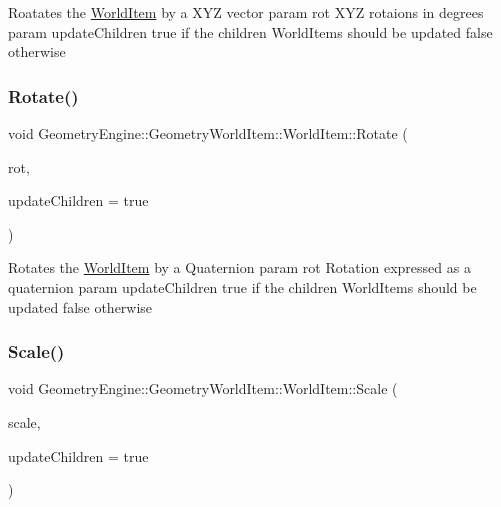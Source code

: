 Roatates the \mbox{\hyperlink{class_geometry_engine_1_1_geometry_world_item_1_1_world_item}{World\+Item}} by a X\+YZ vector param rot X\+YZ rotaions in degrees param update\+Children true if the children World\+Items should be updated false otherwise \mbox{\label{class_geometry_engine_1_1_geometry_world_item_1_1_world_item_aabed6bd78138071c0c7fb50a415ff285}} 
\subsubsection{\texorpdfstring{Rotate()}{Rotate()}\hspace{0.1cm}{\footnotesize\ttfamily [2/2]}}
{\footnotesize\ttfamily void Geometry\+Engine\+::\+Geometry\+World\+Item\+::\+World\+Item\+::\+Rotate (\begin{DoxyParamCaption}\item[{const Q\+Quaternion \&}]{rot,  }\item[{bool}]{update\+Children = {\ttfamily true} }\end{DoxyParamCaption})}

Rotates the \mbox{\hyperlink{class_geometry_engine_1_1_geometry_world_item_1_1_world_item}{World\+Item}} by a Quaternion param rot Rotation expressed as a quaternion param update\+Children true if the children World\+Items should be updated false otherwise \mbox{\label{class_geometry_engine_1_1_geometry_world_item_1_1_world_item_ad6ca95d9209a5ab13975a3a7347b497d}} 
\subsubsection{\texorpdfstring{Scale()}{Scale()}}
{\footnotesize\ttfamily void Geometry\+Engine\+::\+Geometry\+World\+Item\+::\+World\+Item\+::\+Scale (\begin{DoxyParamCaption}\item[{const Q\+Vector3D \&}]{scale,  }\item[{bool}]{update\+Children = {\ttfamily true} }\end{DoxyParamCaption})}

